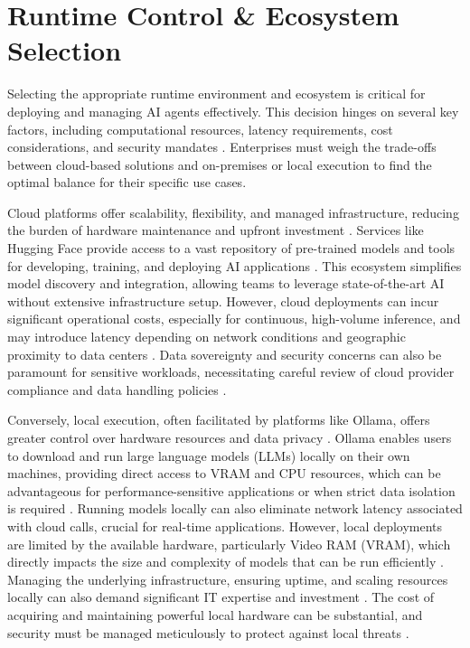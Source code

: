 \section{Runtime Control \& Ecosystem Selection}

Selecting the appropriate runtime environment and ecosystem is critical for deploying and managing AI agents effectively. This decision hinges on several key factors, including computational resources, latency requirements, cost considerations, and security mandates \cite{Reger2026}. Enterprises must weigh the trade-offs between cloud-based solutions and on-premises or local execution to find the optimal balance for their specific use cases.

Cloud platforms offer scalability, flexibility, and managed infrastructure, reducing the burden of hardware maintenance and upfront investment \cite{Reger2026}. Services like Hugging Face provide access to a vast repository of pre-trained models and tools for developing, training, and deploying AI applications \cite{HuggingFaceSmolagents}. This ecosystem simplifies model discovery and integration, allowing teams to leverage state-of-the-art AI without extensive infrastructure setup. However, cloud deployments can incur significant operational costs, especially for continuous, high-volume inference, and may introduce latency depending on network conditions and geographic proximity to data centers \cite{Reger2026}. Data sovereignty and security concerns can also be paramount for sensitive workloads, necessitating careful review of cloud provider compliance and data handling policies \cite{Gartner2025}.

Conversely, local execution, often facilitated by platforms like Ollama, offers greater control over hardware resources and data privacy \cite{OllamaDocs}. Ollama enables users to download and run large language models (LLMs) locally on their own machines, providing direct access to VRAM and CPU resources, which can be advantageous for performance-sensitive applications or when strict data isolation is required \cite{OllamaDocs}. Running models locally can also eliminate network latency associated with cloud calls, crucial for real-time applications. However, local deployments are limited by the available hardware, particularly Video RAM (VRAM), which directly impacts the size and complexity of models that can be run efficiently \cite{Reger2026}. Managing the underlying infrastructure, ensuring uptime, and scaling resources locally can also demand significant IT expertise and investment \cite{Gartner2025}. The cost of acquiring and maintaining powerful local hardware can be substantial, and security must be managed meticulously to protect against local threats \cite{Reger2026}.

